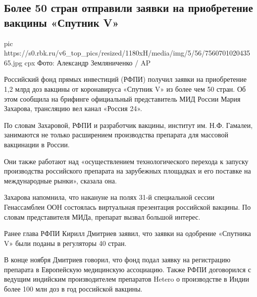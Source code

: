  
 
 
 
 
 
\subsection{Более 50 стран отправили заявки на приобретение вакцины «Спутник V»}
\label{sec:03_12_2020.news.ru.rbc.1.vaccine_sputnik_v_zajavki}


\ifcmt
pic https://s0.rbk.ru/v6_top_pics/resized/1180xH/media/img/5/56/756070102043565.jpg
cpx Фото: Александр Земляниченко / AP
\fi

Российский фонд прямых инвестиций (РФПИ) получил заявки на приобретение 1,2
млрд доз вакцины от коронавируса «Спутник V» из более чем 50 стран. Об этом
сообщила на брифинге официальный представитель МИД России Мария Захарова,
трансляцию вел канал «Россия 24».

По словам Захаровой, РФПИ и разработчик вакцины, институт им. Н.Ф. Гамалеи,
занимаются не только расширением производства препарата для массовой вакцинации
в России.

Они также работают над «осуществлением технологического перехода к запуску
производства российского препарата на зарубежных площадках и его поставке на
международные рынки», сказала она.

Захарова напомнила, что накануне на полях 31-й специальной сессии Генассамблеи
ООН состоялась виртуальная презентация российской вакцины. По словам
представителя МИДа, препарат вызвал большой интерес.

Ранее глава РФПИ Кирилл Дмитриев
заявил, что
заявки на одобрение «Спутника V» были поданы в регуляторы 40 стран.

В конце ноября Дмитриев
говорил, что
фонд подал заявку на регистрацию препарата в Европейскую медицинскую
ассоциацию. Также РФПИ
договорился
с ведущим индийским производителем препаратов Hetero о производстве в Индии
более 100 млн доз в год российской вакцины.


